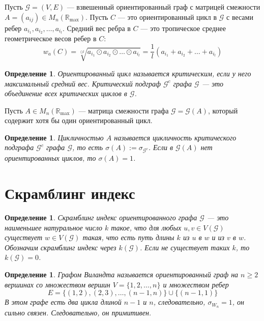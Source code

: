 \documentclass[12pt]{article}
\newtheorem{definition}[theorem]{Определение}
\begin{document}
Пусть $\mathcal{G} = (V, E)$ --- взвешенный ориентированный граф с матрицей смежности $A = (a_{ij}) \in M_n(\mathbb{R}_{\max})$. Пусть $C$ --- это ориентированный цикл в $\mathcal{G}$ с весами ребер $a_{i_1}, a_{i_2}, \dots, a_{i_l}$. Средний вес ребра в $C$ --- это тропическое среднее геометрическое весов ребер в $C$:
\begin{equation*}
    w_a(C) = \sqrt[\odot l]{a_{i_1} \odot a_{i_2} \odot \dots \odot a_{i_l}}=
    \frac{1}{l}(a_{i_1} + a_{i_2} + \dots + a_{i_l})
\end{equation*}
\begin{definition}
Ориентированный цикл называется критическим, если у него максимальный средний вес. Критический подграф $\mathcal{G}^c$ графа $\mathcal{G}$ --- это объединение всех критических циклов в $\mathcal{G}$.
\end{definition}

Пусть $A \in M_n(\mathbb{R}_{\max})$ --- матрица смежности графа $\mathcal{G} = \mathcal{G}(A)$, который содержит хотя бы один ориентированный цикл.
\begin{definition} Цикличностью $A$ называется цикличность критического подграфа $\mathcal{G}^c$ графа $\mathcal{G}$, то есть $\sigma(A) := \sigma_{\mathcal{G}^c}$. Если в $\mathcal{G}(A)$ нет ориентированных циклов, то $\sigma(A) = 1$.
\end{definition}

\section {Скрамблинг индекс}
\begin{definition}
Скрамблинг индекс ориентированного графа $\mathcal{G}$ --- это наименьшее натуральное число $k$ такое, что для любых $u, v \in V(\mathcal{G})$ существует $w \in V(\mathcal{G})$ такая, что есть путь длины $k$ из $u$ в $w$ и из $v$ в $w$. Обозначим скрамблинг индекс через $k(\mathcal{G})$. Если не существует таких $k$, то $k(\mathcal{G}) = 0$.
\end{definition}

\begin{definition}
Графом Виландта называется ориентированный граф на $n \ge 2$ вершинах со множеством вершин $V = \{1, 2, \dots, n\}$ и множеством ребер \begin{equation*}
    E = \{(1, 2), (2, 3), \dots, (n-1, n)\} \cup \{(n-1, 1)\}
\end{equation*}
В этом графе есть два цикла длиной $n - 1$ и $n$, следовательно, $\sigma_{W_n} = 1$, он сильно связен. Следовательно, он примитивен.
\end{definition}
\end{document}
